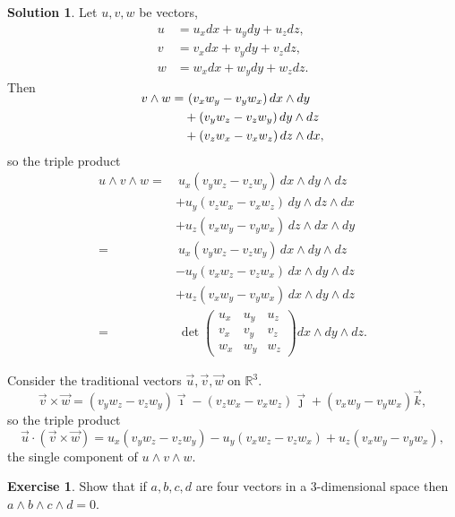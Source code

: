\documentclass[11pt, a4paper]{report}
\theoremstyle{definition}
\newtheorem{ex}{Exercise}[part]
\newtheorem{sol}{Solution}[part]
\begin{document}
\begin{sol}

Let $u, v, w$ be vectors,
\begin{align*}
    u &= u_x dx + u_y dy + u_z dz, \\
    v &= v_x dx + v_y dy + v_z dz, \\
    w &= w_x dx + w_y dy + w_z dz.
\end{align*}
Then
\begin{align*}
    \SwapAboveDisplaySkip
    v \wedge w =&\ (v_x w_y - v_y w_x) \, dx \wedge dy \\
                &+ (v_y w_z - v_z w_y) \, dy \wedge dz \\
                &+ (v_z w_x - v_x w_z) \, dz \wedge dx,
\end{align*}
so the triple product
\begin{align*}
    u \wedge v \wedge w =&\ u_x (v_y w_z - v_z w_y) \, dx \wedge dy \wedge dz \\
        &+ u_y (v_z w_x - v_x w_z) \, dy \wedge dz \wedge dx \\
        &+ u_z (v_x w_y - v_y w_x) \, dz \wedge dx \wedge dy \\
        =&\ u_x (v_y w_z - v_z w_y) \, dx \wedge dy \wedge dz \\
        &- u_y (v_x w_z - v_z w_x) \, dx \wedge dy \wedge dz \\
        &+ u_z (v_x w_y - v_y w_x) \, dx \wedge dy \wedge dz \\
        =&\ \det \begin{pmatrix}
                u_x & u_y & u_z \\
                v_x & v_y & v_z \\
                w_x & w_y & w_z
            \end{pmatrix} dx \wedge dy \wedge dz.
\end{align*}

Consider the traditional vectors $\vec{u}, \vec{v}, \vec{w}$ on $\mathbb{R}^3$.
\[
    \vec{v} \times \vec{w}
        = (v_y w_z - v_z w_y) \vec{\imath}
          - (v_z w_x - v_x w_z) \vec{\jmath}
          + (v_x w_y - v_y w_x) \vec{k},
\]
so the triple product
\[
    \vec{u} \cdot (\vec{v} \times \vec{w})
        = u_x (v_y w_z - v_z w_y)
          - u_y (v_x w_z - v_z w_x)
          + u_z (v_x w_y - v_y w_x),
\]
the single component of $u \wedge v \wedge w$.

\end{sol}

\begin{ex}

Show that if $a, b, c, d$ are four vectors in a 3-dimensional space then $a \wedge b \wedge c \wedge d = 0$.

\end{ex}
\end{document}
